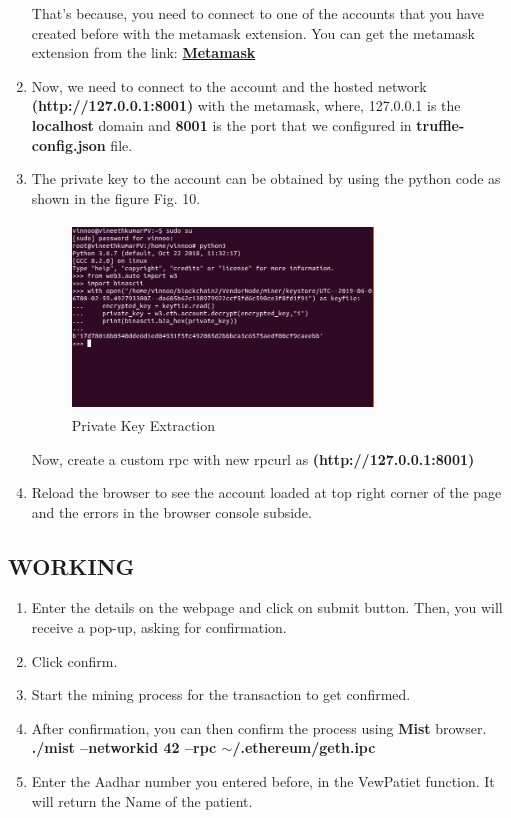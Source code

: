 \documentclass[journal,12pt,twocolumn]{IEEEtran}
\begin{document}
\begin{enumerate}
  That's because, you need to connect to one of the accounts that you have created before with the metamask extension.
  You can get the metamask extension from the link: \href{https://chrome.google.com/webstore/detail/metamask/nkbihfbeogaeaoehlefnkodbefgpgknn}{\textbf{Metamask}}
  
  \item Now, we need to connect to the account and the hosted network \textbf{(http://127.0.0.1:8001)} with the metamask, where, 127.0.0.1 is the \textbf{localhost} domain and \textbf{8001} is the port that we configured in \textbf{truffle-config.json} file.
  
  \item The private key to the account can be obtained by using the python code as shown in the figure Fig. 10.
  
  \begin{figure}[H]
  \includegraphics[width=8cm, height=5cm]{private.png}
  \caption{Private Key Extraction}
  \label{fig:11}
  \end{figure}
  
  Now, create a custom rpc with new rpcurl as \textbf{(http://127.0.0.1:8001)}
  
  \item Reload the browser to see the account loaded at top right corner of the page and the errors in the browser console subside.

\end{enumerate}

\subsection{WORKING}
 \begin{enumerate}
     \item Enter the details on the webpage and click on submit button. Then, you will receive a pop-up, asking for confirmation.
     \item Click confirm.
     \item Start the mining process for the transaction to get confirmed.
     \item After confirmation, you can then confirm the process using \textbf{Mist} browser.\\
     \textbf{./mist --networkid 42 --rpc $\sim$/.ethereum/geth.ipc}
     \item Enter the Aadhar number you entered before, in the VewPatiet function. It will return the Name of the patient.
 \end{enumerate}
\end{document}
